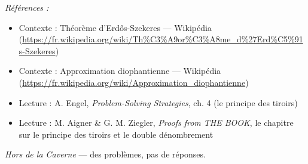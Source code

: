 \documentclass[11pt]{article}
\newenvironment{refs}{\par\small\noindent\emph{Références :}\begin{itemize}\setlength\itemsep{0pt}}{\end{itemize}\normalsize}
\begin{document}
\begin{refs}
\item Contexte : Théorème d'Erd\H{o}s-Szekeres --- Wikipédia (\url{https://fr.wikipedia.org/wiki/Th%C3%A9or%C3%A8me_d%27Erd%C5%91s-Szekeres})
\item Contexte : Approximation diophantienne --- Wikipédia (\url{https://fr.wikipedia.org/wiki/Approximation_diophantienne})
\item Lecture : A. Engel, \textit{Problem-Solving Strategies}, ch. 4 (le principe des tiroirs)
\item Lecture : M. Aigner \& G. M. Ziegler, \textit{Proofs from THE BOOK}, le chapitre sur le principe des tiroirs et le double dénombrement
\end{refs}

\bigskip


\vfill
\noindent\emph{Hors de la Caverne} --- des probl\`emes, pas de r\'eponses.
\end{document}
